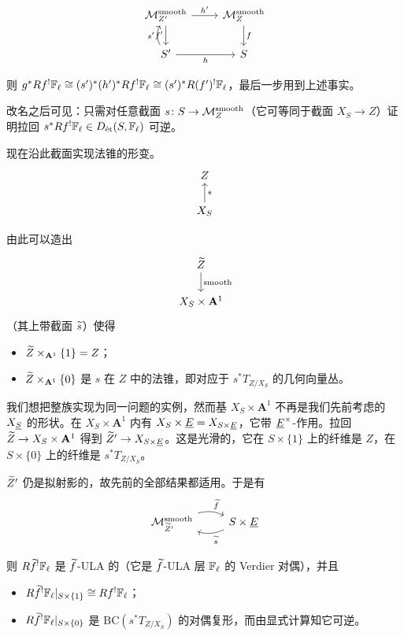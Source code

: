\[
\begin{tikzcd}
\cM^{\mathrm{smooth}}_{Z'} \arrow[r, "h'"] \arrow[d, "f'"'] & \cM^{\mathrm{smooth}}_{Z} \arrow[d, "f"] \\
S' \arrow[r, "h"'] \arrow[u, "s'", bend left=30] & S
\end{tikzcd}
\]

则 $g^*Rf^!\Fl\cong(s')^*(h')^*Rf^!\Fl\cong(s')^*R(f')^!\Fl$，最后一步用到上述事实。

改名之后可见：只需对任意截面 $s\colon S\to\cM_Z^{\mathrm{smooth}}$（它可等同于截面 $X_S\to Z$）证明拉回 $s^*Rf^!\Fl\in D_{\et}(S,\Fl)$ 可逆。

现在沿此截面实现法锥的形变。
\[
\begin{tikzcd}
Z \\
X_S \arrow[u, "s"']
\end{tikzcd}
\]

由此可以造出
\[
\begin{tikzcd}
\wt Z \arrow[d, "\text{smooth}"] \\
X_S\times\mathbf{A}^1
\end{tikzcd}
\]
（其上带截面 $\wt s$）使得
\begin{itemize}
\item $\wt Z\times_{\mathbf{A}^1}\{1\}=Z$；
\item $\wt Z\times_{\mathbf{A}^1}\{0\}$ 是 $s$ 在 $Z$ 中的法锥，即对应于 $s^*T_{Z/X_S}$ 的几何向量丛。
\end{itemize}
我们想把整族实现为同一问题的实例，然而基 $X_S\times\mathbf{A}^1$ 不再是我们先前考虑的 $X_{\ul S}$ 的形状。在 $X_S\times\mathbf{A}^1$ 内有 $X_S\times\ul E=X_{S\times\ul E}$，它带 $\ul E^\times$-作用。拉回 $\wt Z\to X_S\times\mathbf{A}^1$ 得到 $\wt Z'\to X_{S\times\ul E}$。这是光滑的，它在 $S\times\{1\}$ 上的纤维是 $Z$，在 $S\times\{0\}$ 上的纤维是 $s^*T_{Z/X_S}$。

$\wt Z'$ 仍是拟射影的，故先前的全部结果都适用。于是有
\[
\begin{tikzcd}
\cM^{\mathrm{smooth}}_{\wt Z'} \arrow[r, "\wt f", bend left=20] & S\times\ul E \arrow[l, "\wt s", bend left=20]
\end{tikzcd}
\]

则 $R\wt f^!\Fl$ 是 $\wt f$-ULA 的（它是 $\wt f$-ULA 层 $\Fl$ 的 Verdier 对偶），并且
\begin{itemize}
\item $R\wt f^!\Fl|_{S\times\{1\}}\cong Rf^!\Fl$；
\item $R\wt f^!\Fl|_{S\times\{0\}}$ 是 $\mathrm{BC}(s^*T_{Z/X_S})$ 的对偶复形，而由显式计算知它可逆。
\end{itemize}

